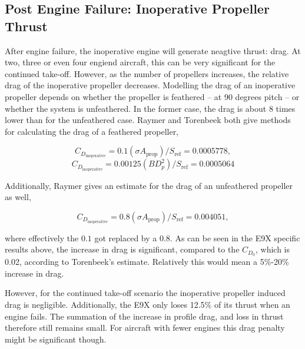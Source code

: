 \subsection{Post Engine Failure: Inoperative Propeller Thrust}
After engine failure, the inoperative engine will generate neagtive thrust: drag. At two, three or even four engiend aircraft, this can be very significant for the continued take-off. However, as the number of propellers increases, the relative drag of the inoperative propeller decreases. Modelling the drag of an inoperative propeller depends on whether the propeller is feathered -- at 90 degrees pitch -- or whether the system is unfeathered. In the former case, the drag is about 8 times lower than for the unfeathered case. Raymer and Torenbeek both give methods for calculating the drag of a feathered propeller,

\begin{multicols}{2}
    \begin{equation}\label{eq:Raymer_featheredprop}
        C_{D_\text{inoperative}}=0.1 (\sigma A_{\text{prop}})/S_\text{ref} = 0.0005778,
    \end{equation}
    \begin{equation}\label{eq:Torenbeek_featheredprop}
        C_{D_\text{inoperative}}=0.00125 (B D_p^2)/S_\text{ref} = 0.0005064
    \end{equation}
\end{multicols}

Additionally, Raymer gives an estimate for the drag of an unfeathered propeller as well,

\begin{equation}\label{eq:Raymer_unfeatheredprop}
    C_{D_\text{inoperative}}=0.8 (\sigma A_{\text{prop}})/S_\text{ref} = 0.004051,
\end{equation}

where effectively the $0.1$ got replaced by a $0.8$. As can be seen in the E9X specific results above, the increase in drag is significant, compared to the $C_{D_0}$, which is 0.02, according to Torenbeek's estimate. Relatively this would mean a 5\%-20\% increase in drag. 

However, for the continued take-off scenario the inoperative propeller induced drag is negligible. Additionally, the E9X only loses 12.5\% of its thrust when an engine fails. The summation of the increase in profile drag, and loss in thrust therefore still remains small. For aircraft with fewer engines this drag penalty might be significant though.

